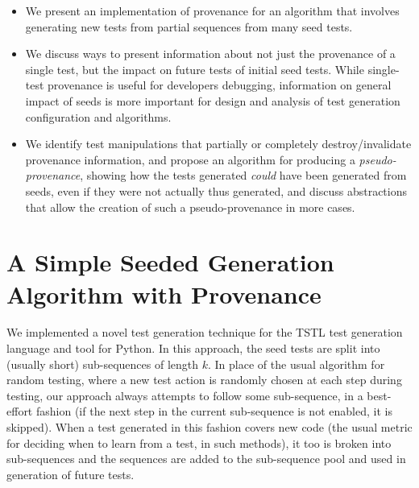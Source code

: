 \documentclass[final]{article}
\begin{document}
\begin{itemize}
\item We present an implementation of provenance for an algorithm that involves
  generating new tests from partial sequences from many seed tests.
\item We discuss ways to present information about not just the
  provenance of a single test, but the impact on future tests of
  initial seed tests.  While single-test provenance is useful for
  developers debugging, information on general impact of seeds is more
  important for design and analysis of test generation configuration
  and algorithms.
\item We identify test manipulations that partially or completely
  destroy/invalidate provenance information, and propose an algorithm
  for producing a \emph{pseudo-provenance}, showing how the tests generated
  \emph{could} have been generated from seeds, even if they were not actually
  thus generated, and discuss abstractions that allow the
  creation of such a pseudo-provenance in more cases.
\end{itemize}

\section{A Simple Seeded Generation Algorithm with Provenance}

We implemented a novel test generation technique for the TSTL
\cite{tstlsttt,nfm15,issta15,tstl} test generation language and tool for
Python.  In this approach, the seed tests are split into (usually short)
sub-sequences of length $k$.  In place of the usual algorithm for
random testing, where a new test action is randomly chosen at each
step during testing, our approach always attempts to follow some
sub-sequence, in a best-effort fashion (if the next step in the
current sub-sequence is not enabled, it is skipped).  When a test
generated in this fashion covers new code (the usual metric for
deciding when to learn from a test, in such methods), it too is broken into sub-sequences
and the sequences are added to the sub-sequence pool and used in generation of
future tests.
\end{document}
